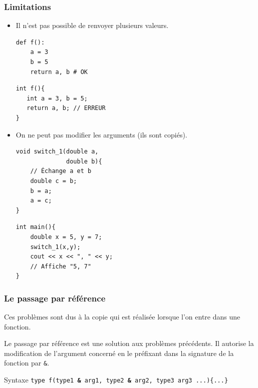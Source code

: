 \begin{frame}[fragile]
	\frametitle{Limitations}
	\begin{itemize}
	\item Il n'est pas possible de renvoyer plusieurs valeurs.
	\begin{minipage}{0.46\linewidth}
		\begin{verbatim}
def f():
    a = 3
    b = 5
    return a, b # OK
		\end{verbatim}
	\end{minipage}
	\hfill
	\begin{minipage}{0.47\linewidth}
		\begin{verbatim}
int f(){
   int a = 3, b = 5;
   return a, b; // ERREUR
}
		\end{verbatim}
	\end{minipage}
	\item On ne peut pas modifier les arguments (ils sont copiés).
	\begin{minipage}{0.46\linewidth}
			\begin{verbatim}
void switch_1(double a,
              double b){
    // Échange a et b
    double c = b;
    b = a;
    a = c;
}
			\end{verbatim}
		\end{minipage}
		\hfill
		\begin{minipage}{0.51\linewidth}
			\begin{verbatim}
int main(){
    double x = 5, y = 7;
    switch_1(x,y);
    cout << x << ", " << y;
    // Affiche "5, 7"
}
			\end{verbatim}
		\end{minipage}
	\end{itemize}
\end{frame}

\begin{frame}
	\frametitle{Le passage par référence}

  Ces problèmes sont dus à la copie qui est réalisée lorsque l'on entre dans une fonction.

	Le passage par référence est une solution aux problèmes précédents. Il autorise la modification de l'argument concerné en le préfixant dans la signature de la fonction par \texttt{\&}.

	\begin{block}{Syntaxe}
	\texttt{type f(type1 {\huge\textbf{\&}} arg1, type2 {\huge\textbf{\&}} arg2, type3 arg3 ...)\{...\}}
	\end{block}
\end{frame}

